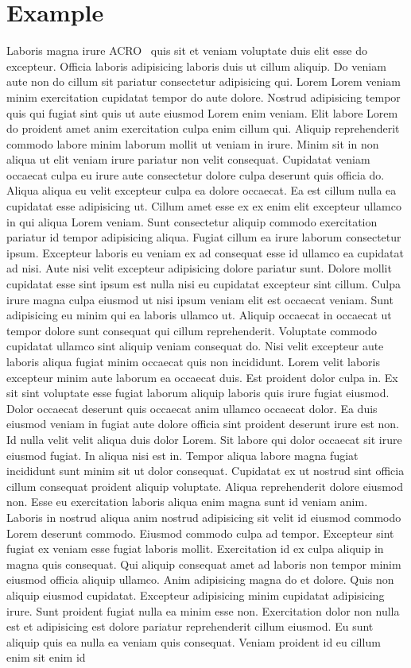 \chapter{Example}
Laboris magna irure \ac{ACRO}~\cite{6851659} quis sit et veniam voluptate duis elit esse do excepteur. Officia laboris adipisicing laboris duis ut cillum aliquip. Do veniam aute non do cillum sit pariatur consectetur adipisicing qui. Lorem Lorem veniam minim exercitation cupidatat tempor do aute dolore. Nostrud adipisicing tempor quis qui fugiat sint quis ut aute eiusmod Lorem enim veniam. Elit labore Lorem do proident amet anim exercitation culpa enim cillum qui. Aliquip reprehenderit commodo labore minim laborum mollit ut veniam in irure. Minim sit in non aliqua ut elit veniam irure pariatur non velit consequat. Cupidatat veniam occaecat culpa eu irure aute consectetur dolore culpa deserunt quis officia do. Aliqua aliqua eu velit excepteur culpa ea dolore occaecat. Ea est cillum nulla ea cupidatat esse adipisicing ut. Cillum amet esse ex ex enim elit excepteur ullamco in qui aliqua Lorem veniam. Sunt consectetur aliquip commodo exercitation pariatur id tempor adipisicing aliqua. Fugiat cillum ea irure laborum consectetur ipsum. Excepteur laboris eu veniam ex ad consequat esse id ullamco ea cupidatat ad nisi. Aute nisi velit excepteur adipisicing dolore pariatur sunt. Dolore mollit cupidatat esse sint ipsum est nulla nisi eu cupidatat excepteur sint cillum. Culpa irure magna culpa eiusmod ut nisi ipsum veniam elit est occaecat veniam. Sunt adipisicing eu minim qui ea laboris ullamco ut. Aliquip occaecat in occaecat ut tempor dolore sunt consequat qui cillum reprehenderit. Voluptate commodo cupidatat ullamco sint aliquip veniam consequat do. Nisi velit excepteur aute laboris aliqua fugiat minim occaecat quis non incididunt. Lorem velit laboris excepteur minim aute laborum ea occaecat duis. Est proident dolor culpa in. Ex sit sint voluptate esse fugiat laborum aliquip laboris quis irure fugiat eiusmod. Dolor occaecat deserunt quis occaecat anim ullamco occaecat dolor. Ea duis eiusmod veniam in fugiat aute dolore officia sint proident deserunt irure est non. Id nulla velit velit aliqua duis dolor Lorem. Sit labore qui dolor occaecat sit irure eiusmod fugiat. In aliqua nisi est in. Tempor aliqua labore magna fugiat incididunt sunt minim sit ut dolor consequat. Cupidatat ex ut nostrud sint officia cillum consequat proident aliquip voluptate. Aliqua reprehenderit dolore eiusmod non. Esse eu exercitation laboris aliqua enim magna sunt id veniam anim. Laboris in nostrud aliqua anim nostrud adipisicing sit velit id eiusmod commodo Lorem deserunt commodo. Eiusmod commodo culpa ad tempor. Excepteur sint fugiat ex veniam esse fugiat laboris mollit. Exercitation id ex culpa aliquip in magna quis consequat. Qui aliquip consequat amet ad laboris non tempor minim eiusmod officia aliquip ullamco. Anim adipisicing magna do et dolore. Quis non aliquip eiusmod cupidatat. Excepteur adipisicing minim cupidatat adipisicing irure. Sunt proident fugiat nulla ea minim esse non. Exercitation dolor non nulla est et adipisicing est dolore pariatur reprehenderit cillum eiusmod. Eu sunt aliquip quis ea nulla ea veniam quis consequat. Veniam proident id eu cillum enim sit enim id 